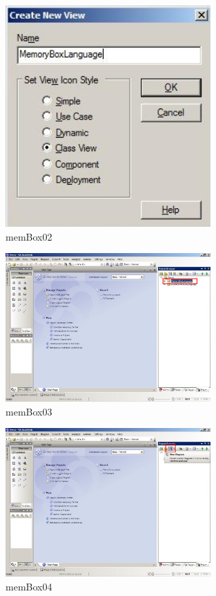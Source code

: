 \begin{figure}[htbp]
	\centering
  \includegraphics[width=0.7\textwidth]{pics/memBox02.png}
	\caption{memBox02}
	\label{memBox02}
\end{figure}

\begin{figure}[htbp]
	\centering
  \includegraphics[width=0.7\textwidth]{pics/memBox03.png}
	\caption{memBox03}
	\label{memBox03}
\end{figure}

\begin{figure}[htbp]
	\centering
  \includegraphics[width=0.7\textwidth]{pics/memBox04.png}
	\caption{memBox04}
	\label{memBox04}
\end{figure}

